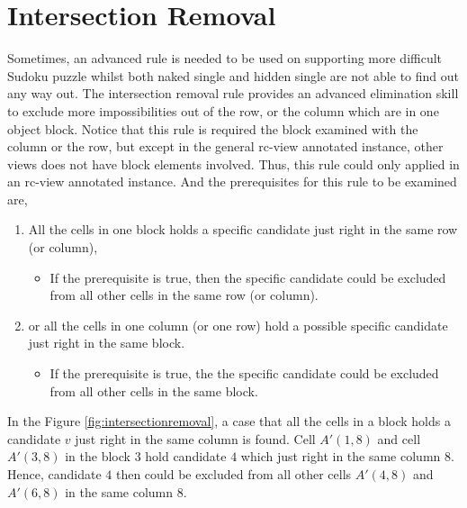 \documentclass[11pt]{report}
\begin{document}
\section{Intersection Removal}
\label{sec:IntersectionRemoval}
Sometimes, an advanced rule is needed to be used on supporting more difficult Sudoku puzzle whilst both naked single and hidden single are not able to find out any way out. The intersection removal rule provides an advanced elimination skill to exclude more impossibilities out of the row, or the column which are in one object block. Notice that this rule is required the block examined with the column or the row, but except in the general rc-view annotated instance, other views does not have block elements involved. Thus, this rule could only applied in an rc-view annotated instance. And the prerequisites for this rule to be examined are, 
\begin{enumerate}
\item All the cells in one block holds a specific candidate just right in the same row (or column),
\begin{itemize}
\item If the prerequisite is true, then the specific candidate could be excluded from all other cells in the same row (or column). 
\end{itemize}
\item or all the cells in one column (or one row) hold a possible specific candidate just right in the same block.
\begin{itemize}
\item If the prerequisite is true, the the specific candidate could be excluded from all other cells in the same block. 
\end{itemize}
\end{enumerate}
In the Figure \ref{fig:intersectionremoval}, a case that all the cells in a block holds a candidate $v$ just right in the same column is found. Cell $A'(1,8)$ and cell $A'(3,8)$ in the block $3$ hold candidate $4$ which just right in the same column $8$. Hence, candidate $4$ then could be excluded from all other cells $A'(4,8)$ and $A'(6,8)$ in the same column $8$.
\end{document}
